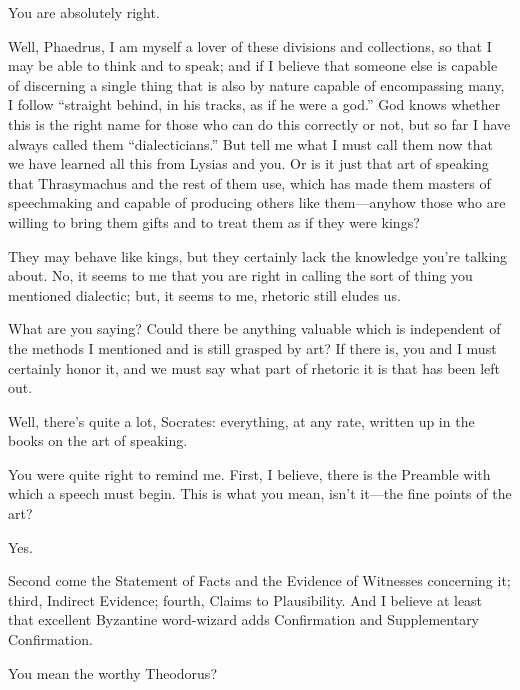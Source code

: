 \sayphaedrus You are absolutely right.

\saysocrates Well, Phaedrus, I am myself a lover of these divisions and
collections, so that I may be able to think and to speak; and if I
believe that someone else is capable of discerning a single thing that
is also by nature capable of encompassing
many, I follow
“straight behind, in his tracks, as if he were a
god.” God knows
whether this is the right name for those who can do this correctly or
not, but so far I have always called them “dialecticians.” But
tell me what I must call them now that we have learned all this from
Lysias and you. Or is it just that art of speaking that Thrasymachus and
the rest of them use, which has made them masters of speechmaking and
capable of producing others like them---anyhow those who are willing to
bring them gifts and to treat them as if they were kings?

\sayphaedrus They may behave like kings, but they certainly lack the
knowledge you're talking about. No, it seems to me that you are right in
calling the sort of thing you mentioned dialectic; but, it seems to me,
rhetoric still eludes us.

\saysocrates What are you saying? Could there be anything valuable which 
is independent of the methods I mentioned and is still grasped
by art? If there is, you and I must certainly honor it, and we must say
what part of rhetoric it is that has been left out.

\sayphaedrus Well, there's quite a lot, Socrates: everything, at any rate,
written up in the books on the art of speaking.

\saysocrates You were quite right to remind me. First, I believe, there is
the Preamble with which a speech must begin. This is what you mean,
isn't it---the fine points of the art?

\sayphaedrus Yes.

\saysocrates Second come the Statement of Facts and the Evidence of
Witnesses concerning it; third, Indirect Evidence; fourth, Claims to
Plausibility. And I believe at least that excellent Byzantine
word-wizard adds Confirmation and Supplementary Confirmation.

\sayphaedrus You mean the worthy Theodorus?

